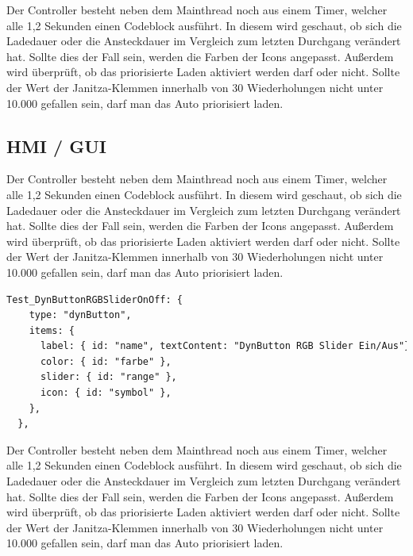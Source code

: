 Der Controller besteht neben dem Mainthread noch aus einem Timer, welcher alle 1,2 Sekunden einen Codeblock ausführt. In diesem wird geschaut, ob sich die Ladedauer oder die Ansteckdauer im Vergleich zum letzten Durchgang verändert hat. Sollte dies der Fall sein, werden die Farben der Icons angepasst. Außerdem wird überprüft, ob das priorisierte Laden aktiviert werden darf oder nicht. Sollte der Wert der Janitza-Klemmen innerhalb von 30 Wiederholungen nicht unter 10.000 gefallen sein, darf man das Auto priorisiert laden. 

\subsection{HMI / GUI} 
Der Controller besteht neben dem Mainthread noch aus einem Timer, welcher alle 1,2 Sekunden einen Codeblock ausführt. In diesem wird geschaut, ob sich die Ladedauer oder die Ansteckdauer im Vergleich zum letzten Durchgang verändert hat. Sollte dies der Fall sein, werden die Farben der Icons angepasst. Außerdem wird überprüft, ob das priorisierte Laden aktiviert werden darf oder nicht. Sollte der Wert der Janitza-Klemmen innerhalb von 30 Wiederholungen nicht unter 10.000 gefallen sein, darf man das Auto priorisiert laden. 

\begin{lstlisting}[language=HTML,caption=Example Element,label=lst:impl:foo]
  Test_DynButtonRGBSliderOnOff: { 
    type: "dynButton", 
    items: { 
      label: { id: "name", textContent: "DynButton RGB Slider Ein/Aus"}, 
      color: { id: "farbe" }, 
      slider: { id: "range" }, 
      icon: { id: "symbol" }, 
    }, 
  }, 
\end{lstlisting}
Der Controller besteht neben dem Mainthread noch aus einem Timer, welcher alle 1,2 Sekunden einen Codeblock ausführt. In diesem wird geschaut, ob sich die Ladedauer oder die Ansteckdauer im Vergleich zum letzten Durchgang verändert hat. Sollte dies der Fall sein, werden die Farben der Icons angepasst. Außerdem wird überprüft, ob das priorisierte Laden aktiviert werden darf oder nicht. Sollte der Wert der Janitza-Klemmen innerhalb von 30 Wiederholungen nicht unter 10.000 gefallen sein, darf man das Auto priorisiert laden. 

